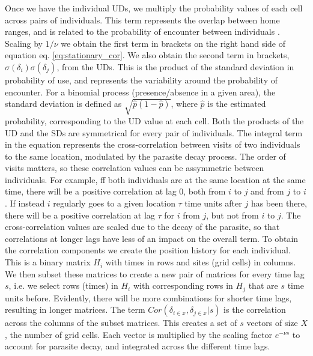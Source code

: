 \documentclass[letterpaper]{article}
\begin{document}
Once we have the individual UDs, we multiply the probability values of each cell across pairs of individuals. This term represents the overlap between home ranges, and is related to the probability of encounter between individuals \citep{Noonan2021}. Scaling by $1/\nu$ we obtain the first term in brackets on the right hand side of equation eq. \ref{eq:stationary_cor}. %
We also obtain the second term in brackets, $\sigma(\delta_i)\sigma(\delta_j)$, from the UDs. This is the product of the standard deviation in probability of use, and represents the variability around the probability of encounter. For a binomial process (presence/absence in a given area), the standard deviation is defined as $\sqrt{\hat p(1-\hat p)}$, where $\hat p$ is the estimated probability, corresponding to the UD value at each cell. Both the products of the UD and the SDs are symmetrical for every pair of individuals. 
The integral term in the equation represents the cross-correlation between visits of two individuals to the same location, modulated by the parasite decay process. The order of visits matters, so these correlation values can be assymmetric between individuals. For example, ff both individuals are at the same location at the same time, there will be a positive correlation at lag 0, both from $i$ to $j$ and from $j$ to $i$. If instead $i$ regularly goes to a given location $\tau$ time units after $j$ has been there, there will be a positive correlation at lag $\tau$ for $i$ from $j$, but not from $i$ to $j$. The cross-correlation values are scaled due to the decay of the parasite, so that correlations at longer lags have less of an impact on the overall term. 
To obtain the correlation components we create the position history for each individual. This is a binary matrix $H_i$ with times in rows and sites (grid cells) in columns. We then subset these matrices to create a new pair of matrices for every time lag $s$, i.e. we select rows (times) in $H_i$ with corresponding rows in $H_j$ that are $s$ time units before. Evidently, there will be more combinations for shorter time lags, resulting in longer matrices. 
The term $Cor(\delta_{i \in x}, \delta_{j \in x} | s)$ is the correlation across the columns of the subset matrices. This creates a set of $s$ vectors of size $X$, the number of grid cells. Each vector is multiplied by the scaling factor $e^{-\nu s}$ to account for parasite decay, and integrated across the different time lags. 
\end{document}
